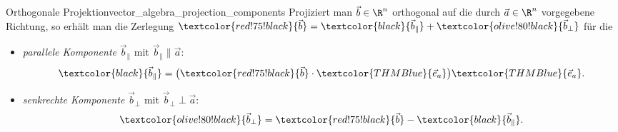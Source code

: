 \begin{TheoremBox}{Orthogonale Projektion}{vector_algebra_projection_components}
  Projiziert man $\vec b\in\R^n$ orthogonal auf die durch
  $\vec a\in\R^n$ vorgegebene Richtung, so erhält man die
  Zerlegung
  $\textcolor{red!75!black}{\vec b}=\textcolor{black}{\vec b_{\parallel}}+\textcolor{olive!80!black}{\vec b_{\perp}}$
  für die
  \par\medskip
  \noindent
  \begin{minipage}[c]{0.54\linewidth}
    \begin{itemize}[leftmargin=1.5em,itemsep=0.8em]
      \item \emph{parallele Komponente}
        $\vec b_{\parallel}$ mit $\vec b_{\parallel}\parallel\vec a$:
        \[
          \textcolor{black}{\vec b_{\parallel}}
          =\bigl(\textcolor{red!75!black}{\vec b}\cdot
            \textcolor{THMBlue}{\vec e_a}\bigr)
            \textcolor{THMBlue}{\vec e_a}.
        \]

      \item \emph{senkrechte Komponente}
        $\vec b_{\perp}$ mit $\vec b_{\perp}\perp\vec a$:
        \[
          \textcolor{olive!80!black}{\vec b_{\perp}}
            =\textcolor{red!75!black}{\vec b}
            -\textcolor{black}{\vec b_{\parallel}}.
        \]
    \end{itemize}
  \end{minipage}\hfill
  \begin{minipage}[c]{0.43\linewidth}
    \centering
  \end{minipage}
\end{TheoremBox}

